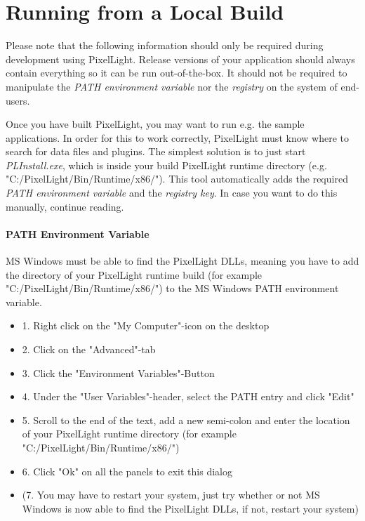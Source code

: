 \section{Running from a Local Build}
Please note that the following information should only be required during development using PixelLight. Release versions of your application should always contain everything so it can be run out-of-the-box. It should not be required to manipulate the \emph{PATH environment variable} nor the \emph{registry} on the system of end-users.

Once you have built PixelLight, you may want to run e.g. the sample applications. In order for this to work correctly, PixelLight must know where to search for data files and plugins. The simplest solution is to just start \emph{PLInstall.exe}, which is inside your build PixelLight runtime directory (e.g. "C:/PixelLight/Bin/Runtime/x86/"). This tool automatically adds the required \emph{PATH environment variable} and the \emph{registry key}. In case you want to do this manually, continue reading.


\paragraph{PATH Environment Variable}
\ac{MS} Windows must be able to find the PixelLight \ac{DLL}s, meaning you have to add the directory of your PixelLight runtime build (for example "C:/PixelLight/Bin/Runtime/x86/") to the \ac{MS} Windows PATH environment variable.
\begin{itemize}
\item{1. Right click on the "My Computer"-icon on the desktop}
\item{2. Click on the "Advanced"-tab}
\item{3. Click the "Environment Variables"-Button}
\item{4. Under the "User Variables"-header, select the PATH entry and click "Edit"}
\item{5. Scroll to the end of the text, add a new semi-colon and enter the location of your PixelLight runtime directory (for example "C:/PixelLight/Bin/Runtime/x86/")}
\item{6. Click "Ok" on all the panels to exit this dialog}
\item{(7. You may have to restart your system, just try whether or not \ac{MS} Windows is now able to find the PixelLight \ac{DLL}s, if not, restart your system)}
\end{itemize}


